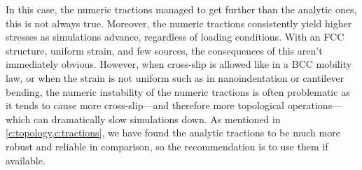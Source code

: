 In this case, the numeric tractions managed to get further than the analytic ones, this is not always true. Moreover, the numeric tractions consistently yield higher stresses as simulations advance, regardless of loading conditions. With an FCC structure, uniform strain, and few sources, the consequences of this aren't immediately obvious. However, when cross-slip is allowed like in a BCC mobility law, or when the strain is not uniform such as in nanoindentation or cantilever bending, the numeric instability of the numeric tractions is often problematic as it tends to cause more cross-slip---and therefore more topological operations---which can dramatically slow simulations down. As mentioned in \cref{c:topology,c:tractions}, we have found the analytic tractions to be much more robust and reliable in comparison, so the recommendation is to use them if available.

